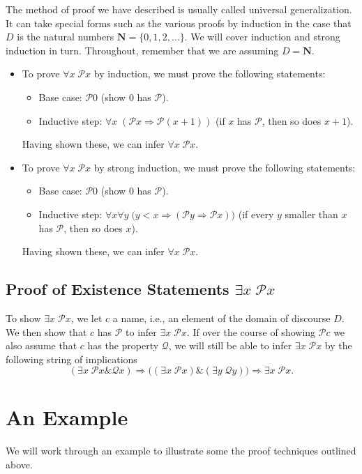 \documentclass[a4paper,11pt]{article}
\newcommand{\PP}{\mathscr{P}}
\newcommand{\QQ}{\mathscr{Q}}
\newcommand{\N}{\mathbf{N}}
\begin{document}
The method of proof we have described is usually called universal
generalization. It can take special forms such as the various proofs by
induction in the case that $D$ is the natural numbers $\N=\{0,1,2,\dots\}$. We
will cover induction and strong induction in turn. Throughout, remember that we
are assuming $D=\N$.
\begin{itemize}
\item To prove $\forall x\;\PP x$ by induction, we must prove the following
  statements: 
  \begin{itemize}
  \item Base case: $\PP 0$ (show 0 has $\PP$).
  \item Inductive step: $\forall x\;(\PP x \Rightarrow \PP(x+1))$ (if $x$ has
    $\PP$, then so does $x+1$).
  \end{itemize}
  Having shown these, we can infer $\forall x\;\PP x$.
\item To prove $\forall x\;\PP x$ by strong induction, we must prove the
  following statements: 
  \begin{itemize}
  \item Base case: $\PP 0$ (show 0 has $\PP$).
  \item Inductive step: $\forall x\forall y\;\Big( y<x \Rightarrow (\PP y
    \Rightarrow \PP x) \Big)$ (if every $y$ smaller than $x$ has $\PP$, then so
    does $x$).
  \end{itemize}
  Having shown these, we can infer $\forall x\;\PP x$.
\end{itemize}

\subsection*{Proof of Existence Statements $\exists x\;\PP x$}

To show $\exists x\;\PP x$, we let $c$ a name, i.e., an element of the domain of
discourse $D$. We then show that $c$ has $\PP$ to infer $\exists x\;\PP x$. If
over the course of showing $\PP c$ we also assume that $c$ has the property
$\QQ$, we will still be able to infer $\exists x\;\PP x$ by the following
string of implications
\[
  (\exists x\;\PP x\&\QQ x) \Rightarrow \Big( (\exists x\;\PP x)\&(\exists
  y\;\QQ y) \Big) \Rightarrow \exists x\;\PP x.
\]

\section{An Example}
 We will work through an example to illustrate some the proof techniques
 outlined above.
\end{document}

